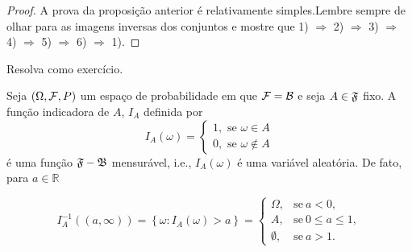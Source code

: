 \begin{frame}
\begin{proof}
	A prova da proposição anterior é relativamente simples.Lembre sempre de olhar para as imagens inversas dos conjuntos e  mostre que 1) $\Rightarrow$ 2) $\Rightarrow$ 3) $\Rightarrow$ 4) $\Rightarrow$ 5) $\Rightarrow$ 6) $\Rightarrow$ 1). 
\end{proof}

Resolva como exercício.
\begin{exem}
Seja $(\Omega, {\cal F}, P)$ um espaço de probabilidade em que ${\cal F} = {\cal
B}$ e seja $A\in \frak{F}$ fixo. A função indicadora de $A$, $I_{A}$ definida por
\begin{equation*}
I_{A}\left( \omega \right) =\left\{ 
\begin{array}{c}
1,\text{ se }\omega \in A \\ 
0,\text{ se }\omega \notin A
\end{array}
\right.
\end{equation*}
é uma função $\frak{F-B}$ mensurável, i.e., $I_{A}\left( \omega \right)$ é uma
variável aleatória. De fato, para $a\in \mathbb{R}$

\begin{equation*}
I_{A}^{-1}\left( \left( a,\infty \right) \right) =\left\{ \omega
:I_{A}\left( \omega \right) >a\right\} =
\begin{cases}
\Omega, & \text{se} \ a<0, \\ 
A, & \text{se} \  0\leq a\leq 1,\\ 
\emptyset, &\text{se} \ a>1.
\end{cases}
\end{equation*}
\end{exem}
\end{frame}

%
%
